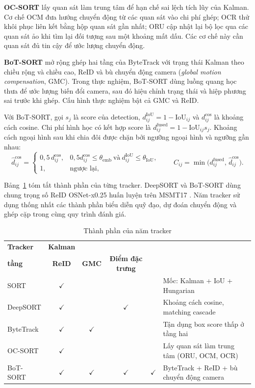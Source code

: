 \documentclass[fontsize=13pt,a4paper,oneside,parskip=false,numbers=noenddot,bibliography=totoc]{scrreprt}
\newcommand{\tm}{$\checkmark$}
\begin{document}
\textbf{OC-SORT} \cite{cao2023ocsort} lấy quan sát làm trung tâm để hạn chế sai lệch tích lũy của Kalman. Cơ chế OCM đưa hướng chuyển động từ các quan sát vào chi phí ghép; OCR thử khôi phục liên kết bằng hộp quan sát gần nhất; ORU cập nhật lại bộ lọc qua các quan sát ảo khi tìm lại đối tượng sau một khoảng mất dấu. Các cơ chế này cần quan sát đủ tin cậy để ước lượng chuyển động.

\textbf{BoT-SORT} \cite{aharon2022botsort} mở rộng ghép hai tầng của ByteTrack với trạng thái Kalman theo chiều rộng và chiều cao, ReID và bù chuyển động camera (\textit{global motion compensation}, GMC). Trong thực nghiệm, BoT-SORT dùng luồng quang học thưa \cite{lucas1981,shi1994} để ước lượng biến đổi camera, sau đó hiệu chỉnh trạng thái và hiệp phương sai trước khi ghép. Cấu hình thực nghiệm bật cả GMC và ReID.

Với BoT-SORT, gọi $s_j$ là score của detection, $d^{\mathrm{IoU}}_{ij}=1-\mathrm{IoU}_{ij}$ và $d^{\cos}_{ij}$ là khoảng cách cosine. Chi phí hình học có kết hợp score là $d^{\mathrm{fused}}_{ij}=1-\mathrm{IoU}_{ij}s_j$. Khoảng cách ngoại hình sau khi chia đôi được chặn bởi ngưỡng ngoại hình và ngưỡng gần nhau:
\begin{equation}
  \hat d^{\cos}_{ij} =
  \begin{cases}
    0{,}5\, d^{\cos}_{ij}, & 0{,}5d^{\cos}_{ij} \leq \theta_{\mathrm{emb}} \ \text{và}\ d^{\mathrm{IoU}}_{ij} \leq \theta_{\mathrm{IoU}},\\
    1, & \text{ngược lại},
  \end{cases}
  \qquad
  C_{ij} = \min\bigl(d^{\mathrm{fused}}_{ij},\, \hat d^{\cos}_{ij}\bigr).
  \label{eq:botsort-cost}
\end{equation}

Bảng~\ref{tab:tracker-thanh-phan} tóm tắt thành phần của từng tracker. DeepSORT và BoT-SORT dùng chung trọng số ReID OSNet-x0.25 huấn luyện trên MSMT17 \cite{zhou2019osnet,wei2018msmt17}. Năm tracker sử dụng thống nhất các thành phần biểu diễn quỹ đạo, dự đoán chuyển động và ghép cặp trong cùng quy trình đánh giá.

\begin{table}[!htbp]
  \centering
  \caption{Thành phần của năm tracker}
  \label{tab:tracker-thanh-phan}
  \small
  \begin{tabularx}{\textwidth}{@{}lcccc>{\raggedright\arraybackslash}X@{}}
    \toprule
    \textbf{Tracker} & \textbf{Kalman} & \shortstack{\textbf{Ghép hai}\\\textbf{tầng}} & \textbf{ReID} & \textbf{GMC} & \textbf{Điểm đặc trưng}\\
    \midrule
    SORT      & \tm & & & & Mốc: Kalman + IoU + Hungarian\\
    DeepSORT  & \tm & & \tm & & Khoảng cách cosine, matching cascade\\
    ByteTrack & \tm & \tm & & & Tận dụng box score thấp ở tầng hai\\
    OC-SORT   & \tm & & & & Lấy quan sát làm trung tâm (ORU, OCM, OCR)\\
    BoT-SORT  & \tm & \tm & \tm & \tm & ByteTrack + ReID + bù chuyển động camera\\
    \bottomrule
  \end{tabularx}
\end{table}
\end{document}
